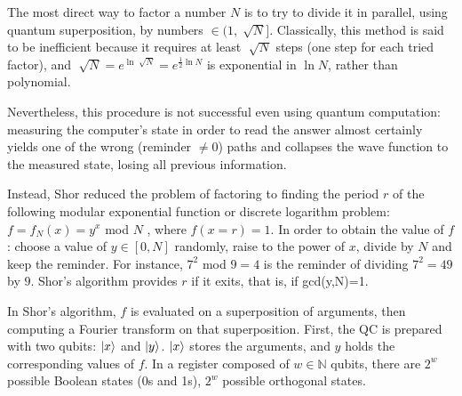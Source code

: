 \documentclass[11pt]{article}
\numberwithin{equation}{section} %
\numberwithin{figure}{section} %
\begin{document}
\begin{appendices}
The most direct way to factor a number $N$ is to try to divide it in parallel, using quantum superposition, by numbers $\in(1,\sqrt[]{N}]$. Classically, this method is said to be inefficient because it requires at least $\sqrt[]{N}$ steps (one step for each tried factor), and $\sqrt[]{N}=e^{\ln\sqrt[]{N}}=e^{\frac{1}{2}\ln N}$ is exponential in $\ln N$, rather than polynomial.

Nevertheless, this procedure is not successful even using quantum computation: measuring the computer's state in order to read the answer almost certainly yields one of the wrong (reminder $\neq 0$) paths and collapses the wave function to the measured state, losing all previous information.  

Instead, Shor reduced the problem of factoring to finding the period $r$ of the following modular exponential function or discrete logarithm problem: $f=f_N(x)=y^x$ mod $N$ \cite[p.~9, l.~37]{Shor}, where $f(x=r)=1$. In order to obtain the value of $f$: choose a value of $y\in[0,N]$ randomly, raise to the power of $x$, divide by $N$ and keep the reminder. For instance, $7^2$ mod $9=4$ is the reminder of dividing $7^2=49$ by $9$. Shor's algorithm provides $r$ if it exits, that is, if gcd(y,N)=1.

In Shor's algorithm, $f$ is evaluated on a superposition of arguments, then computing a Fourier transform on that superposition. First, the QC is prepared with two qubits: $\ket{x}$ and $\ket{y}$. $\ket{x}$ stores the arguments, and $y$ holds the corresponding values of $f$. In a register composed of $w\in\mathbb{N}$ qubits, there are $2^w$ possible Boolean states (0s and 1s), $2^w$ possible orthogonal states.


\end{appendices}
\end{document}
